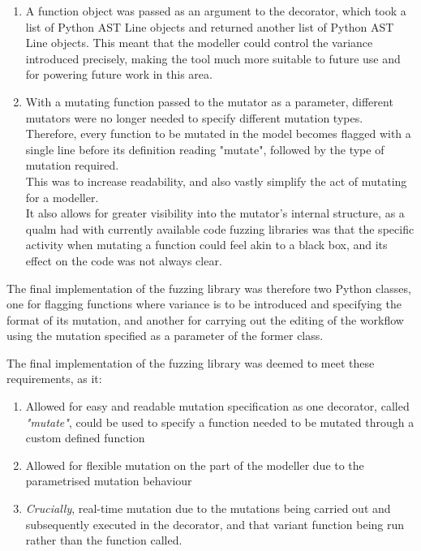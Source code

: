 \begin{enumerate}
    \item A function object was passed as an argument to the decorator, which took a list of Python AST Line objects and returned another list of Python AST Line objects. This meant that the modeller could control the variance introduced precisely, making the tool much more suitable to future use and for powering future work in this area.
    \item With a mutating function passed to the mutator as a parameter, different mutators were no longer needed to specify different mutation types. Therefore, every function to be mutated in the model becomes flagged with a single line before its definition reading "mutate", followed by the type of mutation required.\\This was to increase readability, and also vastly simplify the act of mutating for a modeller.\\It also allows for greater visibility into the mutator's internal structure, as a qualm had with currently available code fuzzing libraries was that the specific activity when mutating a function could feel akin to a black box, and its effect on the code was not always clear.
\end{enumerate}\par

The final implementation of the fuzzing library was therefore two Python classes, one for flagging functions where variance is to be introduced and specifying the format of its mutation, and another for carrying out the editing of the workflow using the mutation specified as a parameter of the former class.\par
The final implementation of the fuzzing library was deemed to meet these requirements, as it: 
\begin{enumerate}  %
    \item Allowed for easy and readable mutation specification as one decorator, called \emph{"mutate"}, could be used to specify a function needed to be mutated through a custom defined function
    \item Allowed for flexible mutation on the part of the modeller due to the parametrised mutation behaviour
    \item \emph{Crucially}, real-time mutation due to the mutations being carried out and subsequently executed in the decorator, and that variant function being run rather than the function called.
\end{enumerate} \par